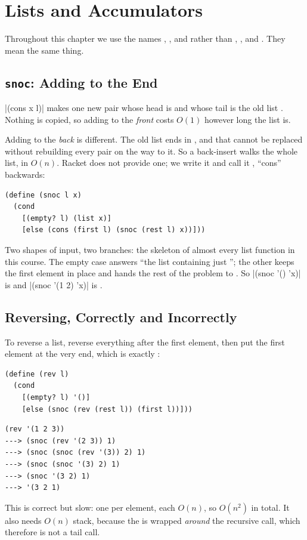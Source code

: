 \section{Lists and Accumulators}
\label{sec:listsrec}

Throughout this chapter we use the names , , and  rather than , , and . They mean the same thing.

\subsection{\texttt{snoc}: Adding to the End}

\rkt|(cons x l)| makes one new pair whose head is  and whose tail is the old list . Nothing is copied, so adding to the \emph{front} costs $O(1)$ however long the list is.

Adding to the \emph{back} is different. The old list ends in , and that  cannot be replaced without rebuilding every pair on the way to it. So a back-insert walks the whole list, in $O(n)$. Racket does not provide one; we write it and call it , ``cons'' backwards:

\begin{lstlisting}
(define (snoc l x)
  (cond
    [(empty? l) (list x)]
    [else (cons (first l) (snoc (rest l) x))]))
\end{lstlisting}

Two shapes of input, two branches: the skeleton of almost every list function in this course. The empty case answers ``the list containing just ''; the other keeps the first element in place and hands the rest of the problem to . So \rkt|(snoc '() 'x)| is  and \rkt|(snoc '(1 2) 'x)| is .

\subsection{Reversing, Correctly and Incorrectly}

To reverse a list, reverse everything after the first element, then put the first element at the very end, which is exactly :
\begin{lstlisting}
(define (rev l)
  (cond
    [(empty? l) '()]
    [else (snoc (rev (rest l)) (first l))]))
\end{lstlisting}
\begin{lstlisting}[style=repl]
(rev '(1 2 3))
---> (snoc (rev '(2 3)) 1)
---> (snoc (snoc (rev '(3)) 2) 1)
---> (snoc (snoc '(3) 2) 1)
---> (snoc '(3 2) 1)
---> '(3 2 1)
\end{lstlisting}
This is correct but slow: one  per element, each $O(n)$, so $O(n^2)$ in total. It also needs $O(n)$ stack, because the  is wrapped \emph{around} the recursive call, which therefore is not a tail call.


